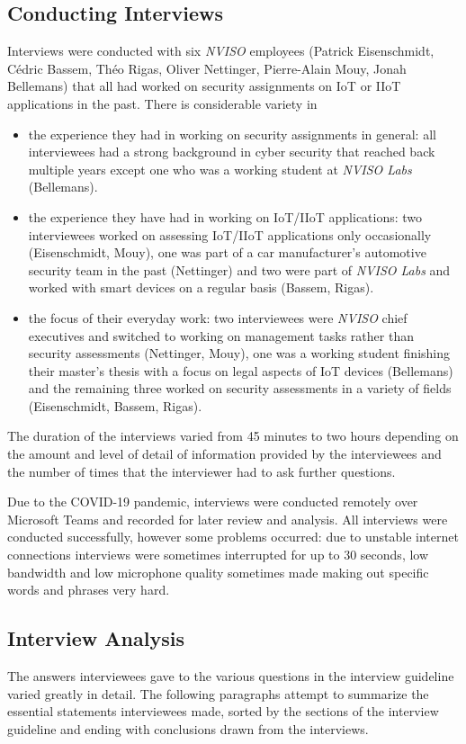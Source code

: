 \subsection{Conducting Interviews}
Interviews were conducted with six
\emph{NVISO} employees (Patrick Eisenschmidt, Cédric Bassem, Théo Rigas, Oliver Nettinger, Pierre-Alain Mouy, Jonah Bellemans) that all had worked on security assignments on \ac{IoT} or \ac{IIoT} applications in the past. There is considerable variety in
\begin{itemize}
    \item the experience they had in working on security assignments in general: all interviewees had a strong background in cyber security that reached back multiple years except one who was a working student at \emph{NVISO Labs} (Bellemans).
    \item the experience they have had in working on \ac{IoT}/\ac{IIoT} applications: two interviewees worked on assessing \ac{IoT}/\ac{IIoT} applications only occasionally (Eisenschmidt, Mouy), one was part of a car manufacturer's automotive security team in the past (Nettinger) and two were part of \emph{NVISO Labs} and worked with smart devices on a regular basis (Bassem, Rigas).
    \item the focus of their everyday work: two interviewees were \emph{NVISO} chief executives and switched to working on management tasks rather than security assessments (Nettinger, Mouy), one was a working student finishing their master's thesis with a focus on legal aspects of \ac{IoT} devices (Bellemans) and the remaining three worked on security assessments in a variety of fields (Eisenschmidt, Bassem, Rigas).
\end{itemize}
The duration of the interviews varied from 45 minutes to two hours depending on the amount and level of detail of information provided by the interviewees and the number of times that the interviewer had to ask further questions.\par
Due to the COVID-19 pandemic, interviews were conducted remotely over Microsoft Teams and recorded for later review and analysis. All interviews were conducted successfully, however some problems occurred: due to unstable internet connections interviews were sometimes interrupted for up to 30 seconds, low bandwidth and low microphone quality sometimes made making out specific words and phrases very hard.

\subsection{Interview Analysis}
The answers interviewees gave to the various questions in the interview guideline varied greatly in detail. The following paragraphs attempt to summarize the essential statements interviewees made, sorted by the sections of the interview guideline and ending with conclusions drawn from the interviews.

